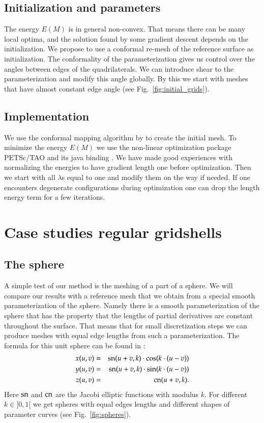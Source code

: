 \documentclass[Thesis.tex]{subfiles}
\begin{document}
\subsection{Initialization and parameters}
The energy $E(M)$ is in general non-convex. That means there can be many local optima, and the solution found by some gradient descent depends on the initialization. We propose to use a conformal re-mesh of the reference surface as initialization. The conformality of the parameterization gives us control over the angles between edges of the quadrilaterals. We can introduce shear to the parameterization and modify this angle globally. By this we start with meshes that have almost constant edge angle (see Fig.~\ref{fig:initial_grids}).

\subsection{Implementation}
We use the conformal mapping algorithm by \cite{Springborn2008} to create the
initial mesh. To minimize the energy $E(M)$ we use the non-linear optimization package
PETSc/TAO \cite{petsc-web-page,tao-user-ref} and its java binding 
\cite{jpetsctao-web-page}. We have made good experiences with normalizing the
 energies to have gradient length one before optimization. Then we start with all
$\lambda$s equal to one and modify them on the way if needed. If one encounters
degenerate configurations during optimization one can drop the length energy term for 
a few iterations.

\section{Case studies regular gridshells}

\subsection{The sphere}
A simple test of our method is the meshing of a part of a sphere. We will compare our results with a reference mesh that we obtain from a special smooth parameterization of the sphere. Namely there is a smooth parameterization of the sphere that has the property that the lengths of partial derivatives are constant throughout the surface. That means that for small discretization steps we can produce meshes with equal edge lengths from such a parameterization. The formula for this unit sphere can be found in \cite{Voss1881}:
\begin{eqnarray*}
	x(u,v)&=&\operatorname{sn}(u+v, k)\cdot \cos(k\cdot (u-v))\\
	y(u,v)&=&\operatorname{sn}(u+v, k)\cdot \sin(k\cdot (u-v))\\
	z(u,v)&=&\operatorname{cn}(u+v, k).
\end{eqnarray*}
Here $\operatorname{sn}$ and $\operatorname{cn}$ are the Jacobi elliptic functions with modulus $k$. For different $k\in ]0,1[$ we get spheres with equal edges lengths and different shapes of parameter curves (see Fig.~\ref{fig:spheres}).
\end{document}
